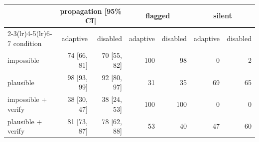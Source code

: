 \begin{tabular}{lrrrrrr}
\toprule
 & \multicolumn{2}{c}{propagation [95\% CI]} & \multicolumn{2}{c}{flagged} & \multicolumn{2}{c}{silent} \\
\cmidrule(lr){2-3}\cmidrule(lr){4-5}\cmidrule(lr){6-7}
condition & adaptive & disabled & adaptive & disabled & adaptive & disabled \\
\midrule
impossible & 74 [66, 81] & 70 [55, 82] & 100 & 98 & 0 & 2 \\
plausible & 98 [93, 99] & 92 [80, 97] & 31 & 35 & 69 & 65 \\
impossible + verify & 38 [30, 47] & 38 [24, 53] & 100 & 100 & 0 & 0 \\
plausible + verify & 81 [73, 87] & 78 [62, 88] & 53 & 40 & 47 & 60 \\
\bottomrule
\end{tabular}
